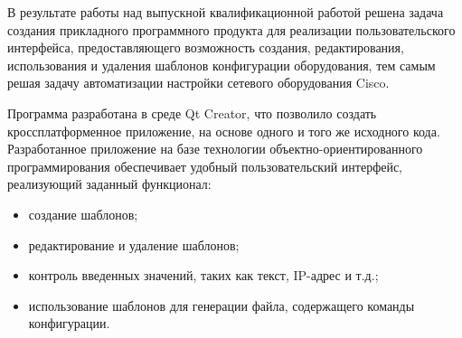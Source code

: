 \Conclusion %


В результате работы над выпускной квалификационной работой решена задача создания прикладного программного продукта для реализации пользовательского интерфейса, предоставляющего возможность создания, редактирования, использования и удаления шаблонов конфигурации оборудования, тем самым решая задачу автоматизации настройки сетевого оборудования Cisco.


Программа разработана в среде Qt Creator, что позволило создать кроссплатформенное приложение, на основе одного и того же исходного кода. Разработанное приложение на базе технологии объектно-ориентированного программирования обеспечивает удобный пользовательский интерфейс, реализующий заданный функционал:

\begin{itemize}
	\item создание шаблонов;
	\item редактирование и удаление шаблонов;
	\item контроль введенных значений, таких как текст, IP-адрес и т.д.;
	\item использование шаблонов для генерации файла, содержащего команды конфигурации.
\end{itemize}
